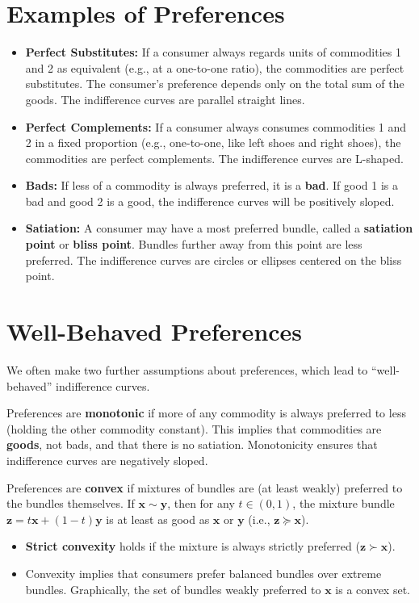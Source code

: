 \section{Examples of Preferences}

\begin{itemize}
    \item \textbf{Perfect Substitutes:} If a consumer always regards units of commodities 1 and 2 as equivalent (e.g., at a one-to-one ratio), the commodities are perfect substitutes. The consumer's preference depends only on the total sum of the goods. The indifference curves are parallel straight lines.
    \item \textbf{Perfect Complements:} If a consumer always consumes commodities 1 and 2 in a fixed proportion (e.g., one-to-one, like left shoes and right shoes), the commodities are perfect complements. The indifference curves are L-shaped.
    \item \textbf{Bads:} If less of a commodity is always preferred, it is a \textbf{bad}. If good 1 is a bad and good 2 is a good, the indifference curves will be positively sloped.
    \item \textbf{Satiation:} A consumer may have a most preferred bundle, called a \textbf{satiation point} or \textbf{bliss point}. Bundles further away from this point are less preferred. The indifference curves are circles or ellipses centered on the bliss point.
\end{itemize}

\section{Well-Behaved Preferences}
We often make two further assumptions about preferences, which lead to ``well-behaved'' indifference curves.
\begin{definition}[Monotonicity]
Preferences are \textbf{monotonic} if more of any commodity is always preferred to less (holding the other commodity constant). This implies that commodities are \textbf{goods}, not bads, and that there is no satiation. Monotonicity ensures that indifference curves are negatively sloped.
\end{definition}

\begin{definition}[Convexity]
Preferences are \textbf{convex} if mixtures of bundles are (at least weakly) preferred to the bundles themselves. If $\mathbf{x} \sim \mathbf{y}$, then for any $t \in (0,1)$, the mixture bundle $\mathbf{z} = t\mathbf{x} + (1-t)\mathbf{y}$ is at least as good as $\mathbf{x}$ or $\mathbf{y}$ (i.e., $\mathbf{z} \succeq \mathbf{x}$).
\begin{itemize}
    \item \textbf{Strict convexity} holds if the mixture is always strictly preferred ($\mathbf{z} \succ \mathbf{x}$).
    \item Convexity implies that consumers prefer balanced bundles over extreme bundles. Graphically, the set of bundles weakly preferred to $\mathbf{x}$ is a convex set.
\end{itemize}
\end{definition}

